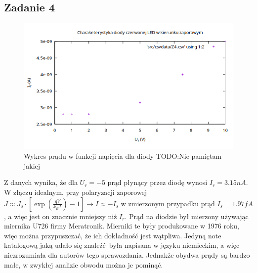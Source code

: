 \documentclass{article}
\begin{document}
\subsection{Zadanie 4}
\begin{figure}[h]
\centering
  \includegraphics[scale=0.5]{./img/Z4.png}
  \caption{Wykres prądu w funkcji napięcia dla diody TODO:Nie pamiętam jakiej}
\end{figure}
\centering
Z danych wynika, że dla $U_r = -5$ prąd płynący przez diodę wynosi $I_r=3.15nA$.
W złączu idealnym, przy polaryzacji zaporowej $ J \approx J_s \cdot [\exp{(\frac{qV}{k_BT})}-1] \rightarrow 
I \approx -I_s$ w zmierzonym przypadku prąd $I_s=1.97fA$, a więc jest on znacznie mniejszy niż $I_r$. 
Prąd na diodzie był mierzony używając miernika U726 firmy Meratronik. Mierniki te były produkowane w 1976 roku,
więc można przypuszczać, że ich dokładność jest wątpliwa. Jedyną note katalogową jaką udało się znaleźć była
napisana w języku niemieckim, a więc niezrozumiała dla autorów tego sprawozdania.
Jednakże obydwa prądy są bardzo małe, w zwykłej analizie obwodu można je pominąć. 
\end{document}
